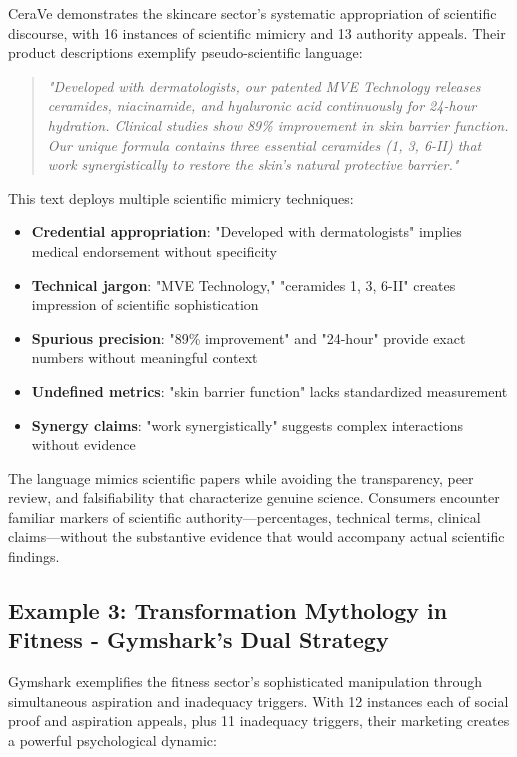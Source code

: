 CeraVe demonstrates the skincare sector's systematic appropriation of scientific discourse, with 16 instances of scientific mimicry and 13 authority appeals. Their product descriptions exemplify pseudo-scientific language:

\begin{quote}
\textit{"Developed with dermatologists, our patented MVE Technology releases ceramides, niacinamide, and hyaluronic acid continuously for 24-hour hydration. Clinical studies show 89\% improvement in skin barrier function. Our unique formula contains three essential ceramides (1, 3, 6-II) that work synergistically to restore the skin's natural protective barrier."}
\end{quote}

This text deploys multiple scientific mimicry techniques:
\begin{itemize}
\item \textbf{Credential appropriation}: "Developed with dermatologists" implies medical endorsement without specificity
\item \textbf{Technical jargon}: "MVE Technology," "ceramides 1, 3, 6-II" creates impression of scientific sophistication
\item \textbf{Spurious precision}: "89\% improvement" and "24-hour" provide exact numbers without meaningful context
\item \textbf{Undefined metrics}: "skin barrier function" lacks standardized measurement
\item \textbf{Synergy claims}: "work synergistically" suggests complex interactions without evidence
\end{itemize}

The language mimics scientific papers while avoiding the transparency, peer review, and falsifiability that characterize genuine science. Consumers encounter familiar markers of scientific authority—percentages, technical terms, clinical claims—without the substantive evidence that would accompany actual scientific findings.

\subsection{Example 3: Transformation Mythology in Fitness - Gymshark's Dual Strategy}

Gymshark exemplifies the fitness sector's sophisticated manipulation through simultaneous aspiration and inadequacy triggers. With 12 instances each of social proof and aspiration appeals, plus 11 inadequacy triggers, their marketing creates a powerful psychological dynamic:

